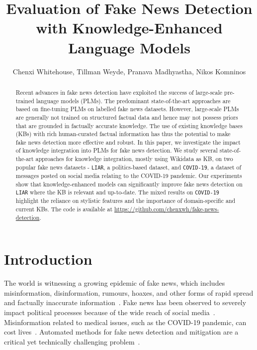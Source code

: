 \documentclass[letterpaper]{article} %
\title{Evaluation of Fake News Detection with Knowledge-Enhanced Language Models}
\author{
Chenxi Whitehouse, Tillman Weyde, Pranava Madhyastha, Nikos Komninos
}
\begin{document}
\maketitle


\begin{abstract}

Recent advances in fake news detection have exploited the success of large-scale pre-trained language models (PLMs).
The predominant state-of-the-art approaches are based on fine-tuning PLMs on labelled fake news datasets.
However, large-scale PLMs are generally not trained on structured factual data and hence may not possess priors that are grounded in factually accurate knowledge.
The use of existing knowledge bases (KBs) with rich human-curated factual information has thus the potential to make fake news detection more effective and robust.
In this paper, we investigate the impact of knowledge integration into PLMs for fake news detection.
We study several state-of-the-art approaches for knowledge integration, mostly using Wikidata as KB, on two popular fake news datasets - \texttt{LIAR}, a politics-based dataset, and \texttt{COVID-19}, a dataset of messages posted on social media relating to the COVID-19 pandemic.
Our experiments show that knowledge-enhanced models can significantly improve fake news detection on \texttt{LIAR} where the KB is relevant and up-to-date.
The mixed results on \texttt{COVID-19} highlight the reliance on stylistic features and the importance of domain-specific and current KBs.
The code is available at \url{https://github.com/chenxwh/fake-news-detection}.


\end{abstract}

\section{Introduction}
The world is witnessing a growing epidemic of fake news, which includes misinformation, disinformation, rumours, hoaxes, and other forms of rapid spread and factually inaccurate information~\cite{Sharma2019CombatingFN}.
Fake news has been observed to severely impact political processes because of the wide reach of social media~\cite{2016-Election}.
Misinformation related to medical issues, such as the COVID-19 pandemic, can cost lives~\cite{OConnor2020GoingVD}.
Automated methods for fake news detection and mitigation are a critical yet technically challenging problem~\cite{thorne-vlachos-2018-automated}.
\end{document}
